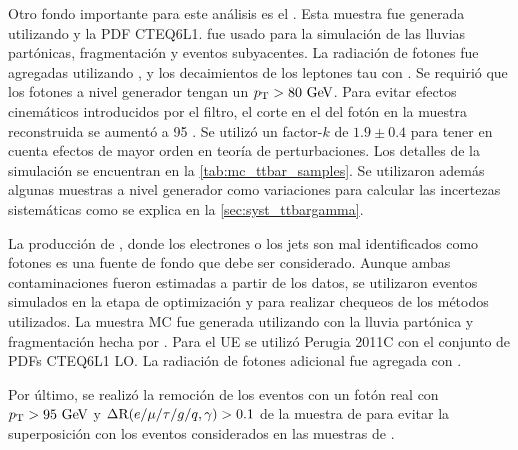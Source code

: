 Otro fondo importante para este análisis es el {\ttgam}. Esta muestra fue
generada utilizando {\madgraph}\cite{Alwall:2007st} y la PDF CTEQ6L1.
{\pythiasix}\cite{pythia} fue usado para la simulación de las lluvias
partónicas, fragmentación y eventos subyacentes. La radiación de fotones fue
agregadas utilizando {\photos}\cite{photos}, y los decaimientos de los leptones
tau con {\tauola}\cite{tauola}. Se requirió que los fotones a nivel generador
tengan un $\pt > 80 \gev$. Para evitar efectos cinemáticos introducidos por el
filtro, el corte en el {\pt} del fotón en la muestra reconstruida se aumentó a
95 {\gev}. Se utilizó un factor-$k$ de $1.9 \pm 0.4$\cite{Melnikov:2011ta, tth}
para tener en cuenta efectos de mayor orden en teoría de perturbaciones.
Los detalles de la simulación se encuentran en la \cref{tab:mc_ttbar_samples}.
Se utilizaron además algunas muestras a nivel generador como variaciones para calcular
las incertezas sistemáticas como se explica en la \cref{sec:syst_ttbargamma}.

La producción de {\ttbar}, donde los electrones o los jets son mal identificados
como fotones es una fuente de fondo que debe ser considerado. Aunque ambas
contaminaciones fueron estimadas a partir de los datos, se utilizaron eventos simulados
en la etapa de optimización y para realizar chequeos de los métodos utilizados.
La
muestra MC fue generada utilizando
{\powheg}\cite{Nason:2004rx,Frixione:2007vw,Alioli:2010xd} con la lluvia
partónica y fragmentación hecha por {\pythia}. Para el UE se utilizó Perugia
2011C con el
conjunto de PDFs CTEQ6L1 LO. La radiación de fotones adicional fue agregada con
{\photos}\cite{photos}.

Por último, se realizó la remoción
de los eventos con un fotón real con $\pt > 95 \gev$ y $\Delta{\rm R}(e/\mu/\tau/g/q,\gamma) > 0.1$ de la muestra de {\ttbar} para evitar la superposición con los eventos
considerados en las muestras de {\ttgam}.


